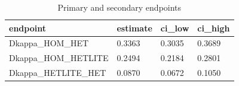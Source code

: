 \begin{table}[t]\centering
\caption{Primary and secondary endpoints}
\begin{tabular}{llll}
\toprule
endpoint & estimate & ci\_low & ci\_high \\
\midrule
Dkappa\_HOM\_HET & 0.3363 & 0.3035 & 0.3689 \\
Dkappa\_HOM\_HETLITE & 0.2494 & 0.2184 & 0.2801 \\
Dkappa\_HETLITE\_HET & 0.0870 & 0.0672 & 0.1050 \\
\bottomrule
\end{tabular}
\end{table}

